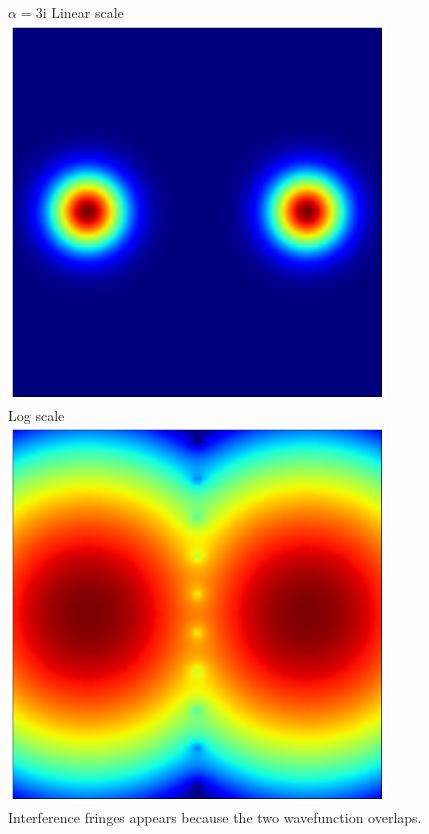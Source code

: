 \documentclass[10pt,fleqn]{article}
\newcommand{\ui}{\mathrm{i}}
\begin{document}
\subsection{}
$\alpha=3\ui$
Linear scale\\
\includegraphics[width=10cm]{3-2-lin.png}\\
Log scale\\
\includegraphics[width=10cm]{3-2-log.png}\\
Interference fringes appears because the two wavefunction overlaps.


\subsection{}
\subsection{}
\subsection{}
\end{document}

